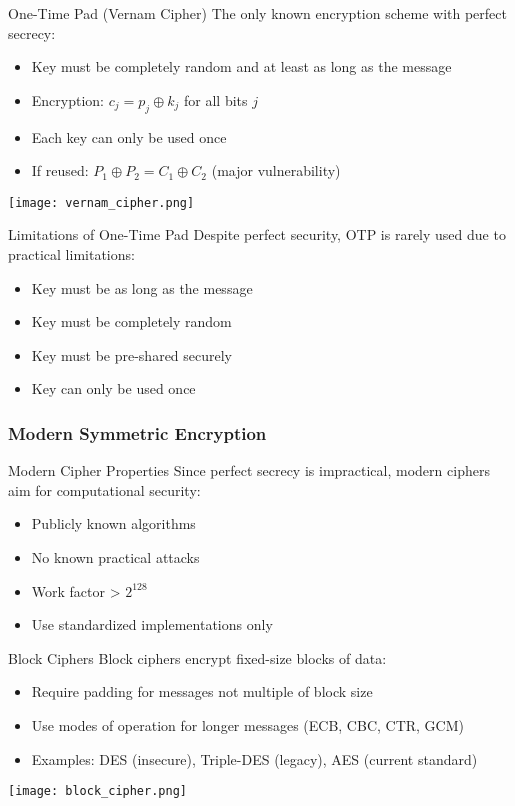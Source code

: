 \begin{concept}{One-Time Pad (Vernam Cipher)}
    The only known encryption scheme with perfect secrecy:
    \begin{itemize}
        \item Key must be completely random and at least as long as the message
        \item Encryption: $c_j = p_j \oplus k_j$ for all bits $j$
        \item Each key can only be used once
        \item If reused: $P_1 \oplus P_2 = C_1 \oplus C_2$ (major vulnerability)
    \end{itemize}
    \texttt{[image: vernam\_cipher.png]}
\end{concept}

\begin{concept}{Limitations of One-Time Pad}
    Despite perfect security, OTP is rarely used due to practical limitations:
    \begin{itemize}
        \item Key must be as long as the message
        \item Key must be completely random
        \item Key must be pre-shared securely
        \item Key can only be used once
    \end{itemize}
\end{concept}

\subsubsection{Modern Symmetric Encryption}

\begin{concept}{Modern Cipher Properties}
    Since perfect secrecy is impractical, modern ciphers aim for computational security:
    \begin{itemize}
        \item Publicly known algorithms
        \item No known practical attacks
        \item Work factor > $2^{128}$
        \item Use standardized implementations only
    \end{itemize}
\end{concept}

\begin{concept}{Block Ciphers}
    Block ciphers encrypt fixed-size blocks of data:
    \begin{itemize}
        \item Require padding for messages not multiple of block size
        \item Use modes of operation for longer messages (ECB, CBC, CTR, GCM)
        \item Examples: DES (insecure), Triple-DES (legacy), AES (current standard)
    \end{itemize}
    \texttt{[image: block\_cipher.png]}
\end{concept}

